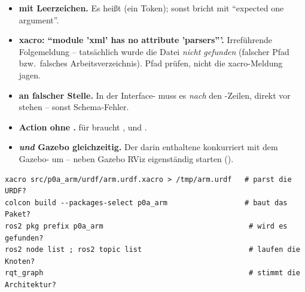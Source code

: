 \begin{warnbox}[title={Stolpersteine, die fast jeden treffen}]
\begin{itemize}
{  (mit Gazebo).} Sim-Zeit-Problem. Zweierlei nötig: (1)~ von Gazebo
  nach ROS brücken (, siehe ) --
  fehlt sie, warnt der  ``No clock received''; (2)~%
   \emph{und} RViz mit 
  starten. Nur beides zusammen liefert konsistente TF-Zeitstempel.
\item \textbf{ mit Leerzeichen.} Es heißt 
  (ein Token); sonst bricht  mit ``expected one argument''.
\item \textbf{xacro: ``module 'xml' has no attribute 'parsers'''.} Irreführende
  Folgemeldung -- tatsächlich wurde die Datei \emph{nicht gefunden} (falscher Pfad
  bzw.\ falsches Arbeitsverzeichnis). Pfad prüfen, nicht die xacro-Meldung jagen.
\item \textbf{ an falscher Stelle.} In der
  Interface- muss es \emph{nach} den -Zeilen,
  direkt vor  stehen -- sonst Schema-Fehler.
\item \textbf{Action ohne .} 
  für  braucht ,
   und .
\item \textbf{ \emph{und} Gazebo gleichzeitig.} Der darin
  enthaltene  konkurriert mit dem Gazebo-%
   um  -- neben Gazebo RViz
  eigenständig starten ().
\end{itemize}
\end{warnbox}

\begin{infobox}[title=Schnelle Prüfbefehle]
\begin{lstlisting}[style=bash]
xacro src/p0a_arm/urdf/arm.urdf.xacro > /tmp/arm.urdf   # parst die URDF?
colcon build --packages-select p0a_arm                  # baut das Paket?
ros2 pkg prefix p0a_arm                                  # wird es gefunden?
ros2 node list ; ros2 topic list                         # laufen die Knoten?
rqt_graph                                                # stimmt die Architektur?
\end{lstlisting}
\end{infobox}

